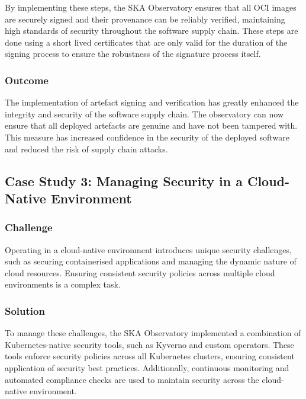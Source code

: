 \documentclass[a4paper]{spie}  %
\begin{document}
By implementing these steps, the SKA Observatory ensures that all OCI images are securely signed and their provenance can be reliably verified, maintaining high standards of security throughout the software supply chain. These steps are done using a short lived certificates that are only valid for the duration of the signing process to ensure the robustness of the signature process itself.

\subsubsection{Outcome}

The implementation of artefact signing and verification has greatly enhanced the integrity and security of the software supply chain. The observatory can now ensure that all deployed artefacts are genuine and have not been tampered with. This measure has increased confidence in the security of the deployed software and reduced the risk of supply chain attacks.

\subsection{Case Study 3: Managing Security in a Cloud-Native Environment}

\subsubsection{Challenge}

Operating in a cloud-native environment introduces unique security challenges, such as securing containerised applications and managing the dynamic nature of cloud resources. Ensuring consistent security policies across multiple cloud environments is a complex task.

\subsubsection{Solution}

To manage these challenges, the SKA Observatory implemented a combination of Kubernetes-native security tools, such as Kyverno\cite{Kyverno} and custom operators. These tools enforce security policies across all Kubernetes clusters, ensuring consistent application of security best practices. Additionally, continuous monitoring and automated compliance checks are used to maintain security across the cloud-native environment.
\end{document}
